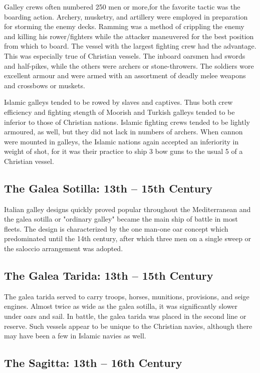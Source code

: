 \documentclass{article}
\begin{document}
\begin{multicols}{3}
Galley crews often numbered 250 men or more,for the favorite tactic
was the boarding action.  Archery, musketry, and artillery were
employed in preparation for storming the enemy decks.  Ramming was a
method of crippling the enemy and killing his rower/fighters while the
attacker maneuvered for the best position from which to board.  The
vessel with the largest fighting crew had the advantage.  This was
especially true of Christian vessels.  The inboard oarsmen had swords
and half-pikes, while the others were archers or stone-throwers.  The
soldiers wore excellent armour and were armed with an assortment of
deadly melee weapons and crossbows or muskets.

Islamic galleys tended to be rowed by slaves and captives.  Thus both
crew efficiency and fighting stength of Moorish and Turkish galleys
tended to be inferior to those of Christian nations.  Islamic fighting
crews tended to be lightly armoured, as well, but they did not lack in
numbers of archers.  When cannon were mounted in galleys, the Islamic
nations again accepted an inferiority in weight of shot, for it was
their practice to ship 3 bow guns to the usual 5 of a Christian
vessel.

\subsection{The Galea Sotilla:  13th -- 15th Century}

Italian galley designs quickly proved popular throughout the
Mediterranean and the galea sotilla or "ordinary galley" became the
main ship of battle in most fleets.  The design is characterized by
the one man-one oar concept which predominated until the 14th century,
after which three men on a single sweep or the saloccio arrangement
was adopted.

\subsection{The Galea Tarida:  13th -- 15th Century}

The galea tarida served to carry troops, horses, munitions,
provisions, and seige engines.  Almost twice as wide as the galea
sotilla, it was significantly slower under oars and sail.  In battle,
the galea tarida was placed in the second line or reserve.  Such
vessels appear to be unique to the Christian navies, although there
may have been a few in Islamic navies as well.

\subsection{The Sagitta:  13th -- 16th Century}


\end{multicols}
\end{document}
